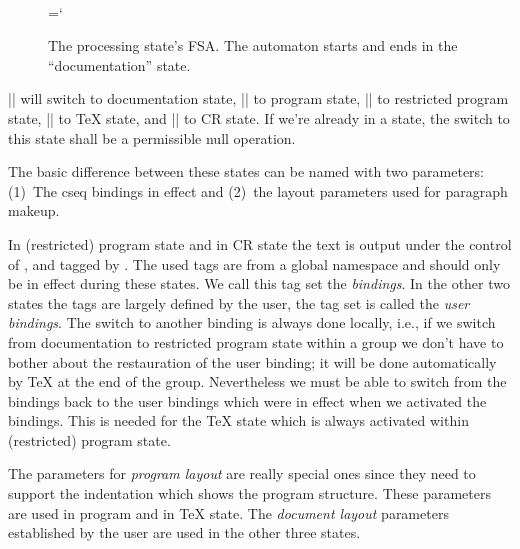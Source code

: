 \documentclass{progltx}
\begin{document}
\begin{figure}

\begin{center}
\chardef\\=`\\

\end{center}

\caption{The processing state's FSA. The automaton starts and ends in
the ``documentation'' state.}
\label{fig:fsa}

\end{figure}

|\cwbb@documentation| will switch to documentation state,
|\cwbb@program| to program state, |\cwbb@Rprogram| to restricted
program state, |\cwbb@tex| to \TeX{} state, and |\cwbb@CR| to CR state.
If we're already in a state, the switch to this state shall be a
permissible null operation.


\sect The basic difference between these states can be named with
two parameters: (1)~The cseq bindings in effect and (2)~the layout
parameters used for paragraph makeup.

In (restricted) program state and in CR state the text is output
under the control of \cweave{}, and tagged by \cweave{}. The used
tags are from a global namespace and should only be in effect during
these states. We call this tag set the \textsl{\cweave{} bindings}. In the
other two states the tags are largely defined by the user, the tag
set is called the \textsl{user bindings}. The switch to another binding
is always done locally, i.e., if we switch from documentation to
restricted program state within a group we don't have to bother about
the restauration of the user binding; it will be done automatically
by \TeX{} at the end of the group. Nevertheless we must be able to
switch from the \cweave{} bindings back to the user bindings which
were in effect when we activated the \cweave{} bindings. This is
needed for the \TeX{} state which is always activated within
(restricted) program state.

The parameters for \textsl{program layout} are really special ones
since they need to support the indentation which shows the program
structure. These parameters are used in program and in \TeX{} state.
The \textsl{document layout} parameters established by the user are
used in the other three states.
\end{document}

